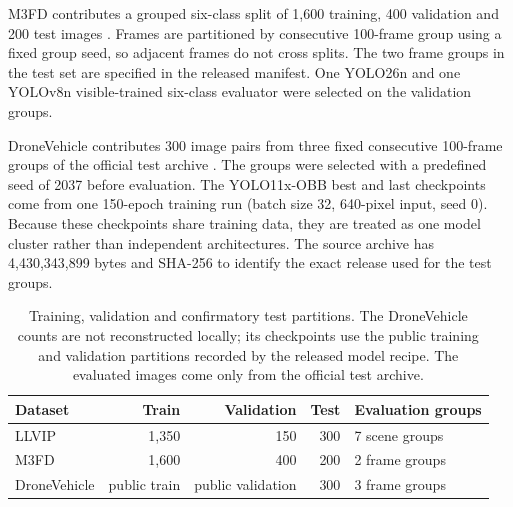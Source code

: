 \documentclass[preprint,11pt]{elsarticle}
\begin{document}
M3FD contributes a grouped six-class split of 1,600 training, 400 validation
and 200 test images \cite{liu2022}. Frames are partitioned by consecutive
100-frame group using a fixed group seed, so adjacent frames do not cross
splits. The two frame groups in the test set are specified in the released
manifest. One YOLO26n and one YOLOv8n visible-trained six-class evaluator were
selected on the validation groups.

DroneVehicle contributes 300 image pairs from three fixed consecutive
100-frame groups of the official test archive \cite{sun2022}. The groups were
selected with a predefined seed of 2037 before evaluation. The YOLO11x-OBB
best and last checkpoints come from one 150-epoch training run (batch size 32,
640-pixel input, seed 0). Because these checkpoints share training data, they
are treated as one model cluster rather than independent architectures. The
source archive has 4,430,343,899 bytes and SHA-256
\texttt{}
to identify the exact release used for the test groups.

\begin{table}[t]
\centering
\small
\caption{Training, validation and confirmatory test partitions. The
DroneVehicle counts are not reconstructed locally; its checkpoints use the
public training and validation partitions recorded by the released model
recipe. The evaluated images come only from the official test archive.}
\label{tab:data}
\begin{tabular}{@{}lrrrl@{}}
\toprule
Dataset & Train & Validation & Test & Evaluation groups \\
\midrule
LLVIP & 1,350 & 150 & 300 & 7 scene groups \\
M3FD & 1,600 & 400 & 200 & 2 frame groups \\
DroneVehicle & public train & public validation & 300 & 3 frame groups \\
\bottomrule
\end{tabular}
\end{table}
\end{document}
